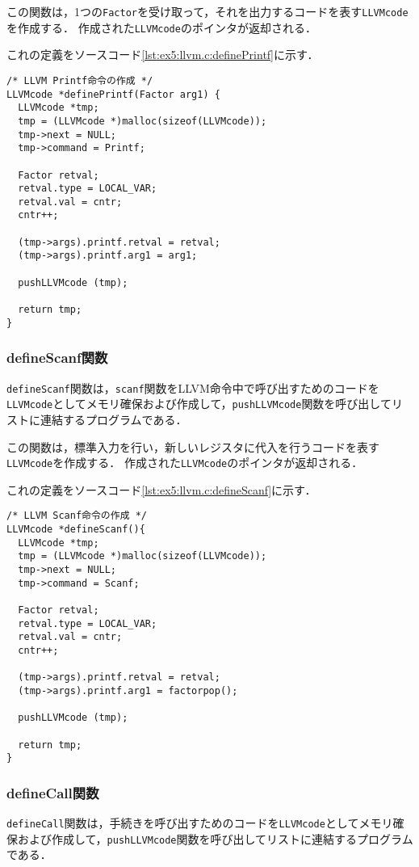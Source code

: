 \documentclass[uplatex]{jsarticle}
\begin{document}
この関数は，1つの\verb#Factor#を受け取って，それを出力するコードを表す\verb#LLVMcode#を作成する．
作成された\verb#LLVMcode#のポインタが返却される．

これの定義をソースコード\ref{lst:ex5:llvm.c:definePrintf}に示す．

\begin{lstlisting}[caption=definePrintf関数の定義,label=lst:ex5:llvm.c:definePrintf]
/* LLVM Printf命令の作成 */
LLVMcode *definePrintf(Factor arg1) {
  LLVMcode *tmp;
  tmp = (LLVMcode *)malloc(sizeof(LLVMcode));
  tmp->next = NULL;
  tmp->command = Printf;

  Factor retval;
  retval.type = LOCAL_VAR;
  retval.val = cntr;
  cntr++;

  (tmp->args).printf.retval = retval;
  (tmp->args).printf.arg1 = arg1;

  pushLLVMcode (tmp);

  return tmp;
}
\end{lstlisting}

\subsubsection{defineScanf関数}
\verb#defineScanf#関数は，\verb#scanf#関数をLLVM命令中で呼び出すためのコードを\verb#LLVMcode#としてメモリ確保および作成して，\verb#pushLLVMcode#関数を呼び出してリストに連結するプログラムである．

この関数は，標準入力を行い，新しいレジスタに代入を行うコードを表す\verb#LLVMcode#を作成する．
作成された\verb#LLVMcode#のポインタが返却される．

これの定義をソースコード\ref{lst:ex5:llvm.c:defineScanf}に示す．

\begin{lstlisting}[caption=defineScanf関数の定義,label=lst:ex5:llvm.c:defineScanf]
/* LLVM Scanf命令の作成 */
LLVMcode *defineScanf(){
  LLVMcode *tmp;
  tmp = (LLVMcode *)malloc(sizeof(LLVMcode));
  tmp->next = NULL;
  tmp->command = Scanf;

  Factor retval;
  retval.type = LOCAL_VAR;
  retval.val = cntr;
  cntr++;

  (tmp->args).printf.retval = retval;
  (tmp->args).printf.arg1 = factorpop();

  pushLLVMcode (tmp);

  return tmp;
}
\end{lstlisting}

\subsubsection{defineCall関数}
\verb#defineCall#関数は，手続きを呼び出すためのコードを\verb#LLVMcode#としてメモリ確保および作成して，\verb#pushLLVMcode#関数を呼び出してリストに連結するプログラムである．
\end{document}
